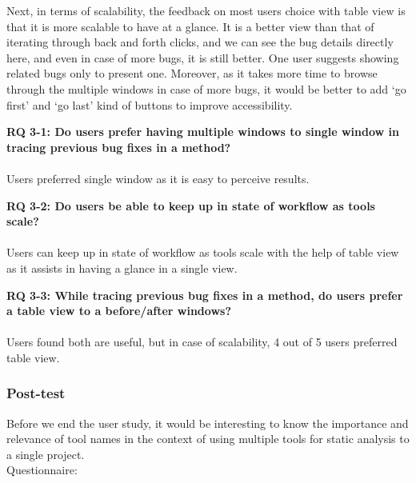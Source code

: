 Next, in terms of scalability, the feedback on most users choice with table view is that it is more scalable to have at a glance. It is a better view than that of iterating through back and forth clicks, and we can see the bug details directly here, and even in case of more bugs, it is still better. One user suggests showing related bugs only to present one. Moreover, as it takes more time to browse through the multiple windows in case of more bugs, it would be better to add ‘go first’ and ‘go last’ kind of buttons to improve accessibility. \\

\begin{myboxi}{{\textbf{RQ 3-1: Do users prefer having multiple windows to single window in tracing previous bug fixes in a method?}}}
	\\ \\ Users preferred single window as it is easy to perceive results. \\
\end{myboxi}

\begin{myboxi}{{\textbf{RQ 3-2: Do users be able to keep up in state of workflow as tools scale?}}}
	\\ \\ Users can keep up in state of workflow as tools scale with the help of table view as it assists in having a glance in a single view. \\
\end{myboxi}

\begin{myboxi}{{\textbf{RQ 3-3: While tracing previous bug fixes in a method, do users prefer a table view to a before/after windows?}}}
	\\ \\ Users found both are useful, but in case of scalability, 4 out of 5 users preferred table view. \\
\end{myboxi}


\subsubsection{Post-test}

Before we end the user study, it would be interesting to know the importance and relevance of tool names in the context of using multiple tools for static analysis to a single project. \\

Questionnaire: \\
 
